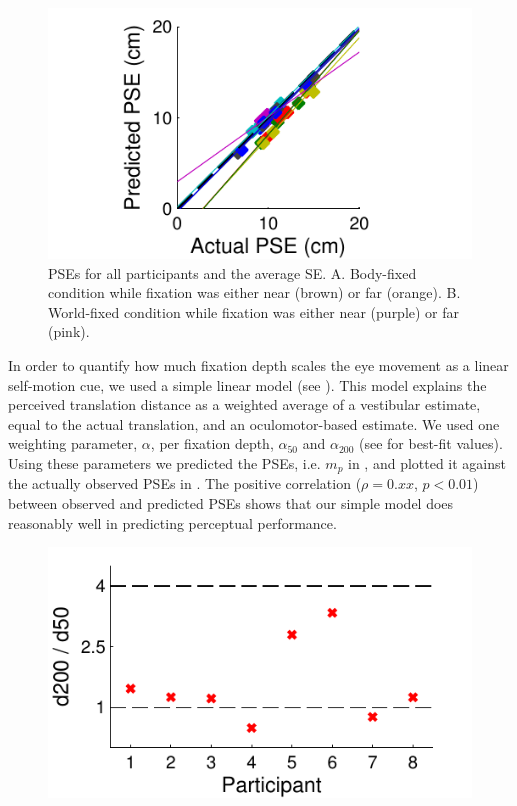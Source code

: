 \begin{figure}
    \includegraphics[width=1.0\textwidth]{src/paper4/p4_figure4.pdf}

	\caption{PSEs for all participants and the average \textpm SE. A.  Body-fixed condition while fixation was either near (brown) or far (orange). B. World-fixed condition while fixation was either near (purple) or far (pink).}
	\label{p4:fig4}
\end{figure}

In order to quantify how much fixation depth scales the eye movement as a linear self-motion cue, we used a simple linear model (see ). This model explains the perceived translation distance as a weighted average of a vestibular estimate, equal to the actual translation, and an oculomotor-based estimate. 
We used one weighting parameter, $\alpha$, per fixation depth, $\alpha_{50}$ and $\alpha_{200}$ (see  for best-fit values). Using these parameters we predicted the PSEs, i.e. $m_p$ in , and plotted it against the actually  observed PSEs in . The positive correlation ($\rho = 0.xx$, $p < 0.01$) between observed and predicted PSEs shows that our simple model does reasonably well in predicting perceptual performance.

\begin{figure}
    \includegraphics[width=1.0\textwidth]{src/paper4/p4_figure5.pdf}

	\caption{}
	\label{p4:fig5}
\end{figure}

